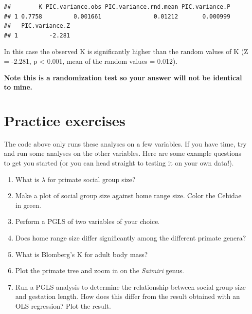 \documentclass[12pt]{article}
\begin{document}
\begin{verbatim}
##        K PIC.variance.obs PIC.variance.rnd.mean PIC.variance.P
## 1 0.7758         0.001661               0.01212       0.000999
##   PIC.variance.Z
## 1         -2.281
\end{verbatim}

In this case the observed K is significantly higher than the random values of K (Z = -2.281, p < 0.001, mean of the random values = 0.012). 

\textbf{Note this is a randomization test so your answer will not be identical to mine.}

\section{Practice exercises}
The code above only runs these analyses on a few variables. If you have time, try and run some analyses on the other variables. Here are some example questions to get you started (or you can head straight to testing it on your own data!).

\begin{enumerate}
\item What is $\lambda$ for primate social group size?
\item Make a plot of social group size against home range size. Color the Cebidae in green. 
\item Perform a PGLS of two variables of your choice.
\item Does home range size differ significantly among the different primate genera?
\item What is Blomberg’s K for adult body mass?
\item Plot the primate tree and zoom in on the \textit{Saimiri} genus.
\item Run a PGLS analysis to determine the relationship between social group size and gestation length. How does this differ from the result obtained with an OLS regression? Plot the result.
\end{enumerate}
\end{document}
